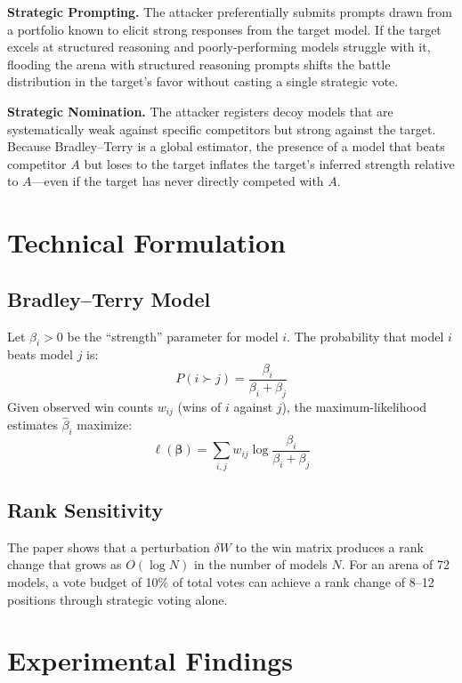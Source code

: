 \documentclass[10pt,twocolumn]{article}
\begin{document}
\textbf{Strategic Prompting.}
The attacker preferentially submits prompts drawn from a portfolio known to elicit strong responses from the target model.
If the target excels at structured reasoning and poorly-performing models struggle with it, flooding the arena with structured reasoning prompts shifts the battle distribution in the target's favor without casting a single strategic vote.

\textbf{Strategic Nomination.}
The attacker registers decoy models that are systematically weak against specific competitors but strong against the target.
Because Bradley--Terry is a global estimator, the presence of a model that beats competitor $A$ but loses to the target inflates the target's inferred strength relative to $A$---even if the target has never directly competed with $A$.

\section{Technical Formulation}

\subsection*{Bradley--Terry Model}

Let $\beta_i > 0$ be the ``strength'' parameter for model $i$.
The probability that model $i$ beats model $j$ is:
\begin{equation}
P(i \succ j) = \frac{\beta_i}{\beta_i + \beta_j}
\label{eq:bt}
\end{equation}
Given observed win counts $w_{ij}$ (wins of $i$ against $j$), the maximum-likelihood estimates $\hat{\beta}_i$ maximize:
\begin{equation}
\ell(\boldsymbol{\beta}) = \sum_{i,j} w_{ij} \log\frac{\beta_i}{\beta_i + \beta_j}
\label{eq:btll}
\end{equation}

\subsection*{Rank Sensitivity}

The paper shows that a perturbation $\delta W$ to the win matrix produces a rank change that grows as $O(\log N)$ in the number of models $N$.
For an arena of 72 models, a vote budget of 10\% of total votes can achieve a rank change of 8--12 positions through strategic voting alone.

\section{Experimental Findings}
\end{document}
